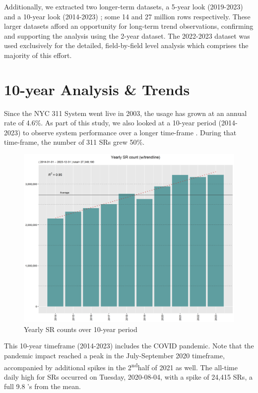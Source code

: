 \documentclass[12pt, titlepage]{article}
\begin{document}
Additionally, we extracted two longer-term datasets, a 5-year look (2019-2023) and a 10-year look (2014-2023) ; some 14 and 27 million rows respectively. 
These larger datasets afford an opportunity for long-term trend observations, confirming and supporting the analysis using the 2-year dataset. The 2022-2023 dataset
was used exclusively for the detailed, field-by-field level analysis which comprises the majority of this effort. 



\section{10-year Analysis \& Trends} \label{sec:trends}

Since the NYC 311 System went live in 2003, the usage has grown at an annual
rate of 4.6\%. As part of this study, we also looked at a 10-year period (2014-2023) to
observe system performance over a longer time-frame . During that time-frame, 
the number of 311 SRs grew 50\%.

\begin{figure}[H]
  \centering
  \includegraphics[width=\textwidth]{Yearly.png}
  \caption{Yearly SR counts over 10-year period}
  \label{fig:yearly-counts}
\end{figure}

This 10-year timeframe (2014-2023) includes the COVID pandemic. Note that the pandemic
impact reached a peak in the July-September 2020 timeframe, accompanied by additional spikes
in the 2\textsuperscript{nd}half of 2021 as well. The all-time daily high for SRs occurred on Tuesday, 2020-08-04, 
with a spike of 24,415 SRs, a full 9.8 \textsigma's from the mean. 
\end{document}
